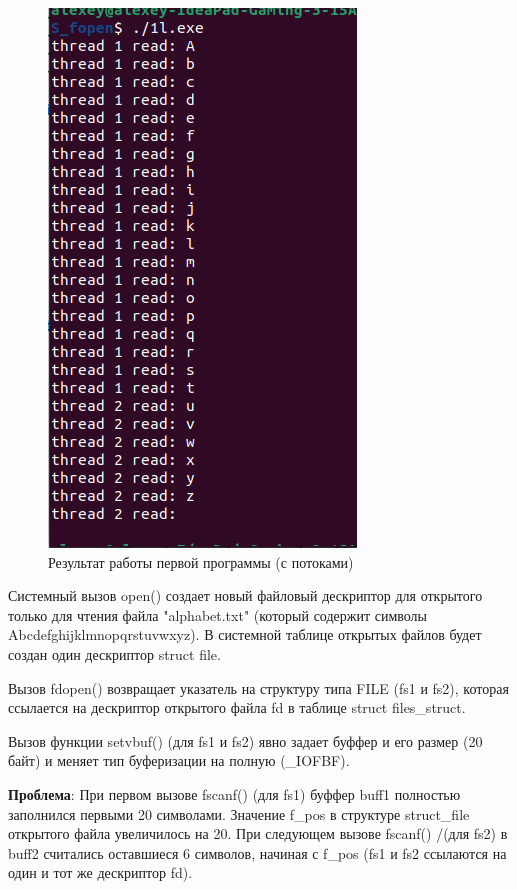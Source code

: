 \documentclass[12pt]{report}
\begin{document}
\begin{figure}[H]
	\centering
	\includegraphics[scale=1]{1lout.png}
	\caption{Результат работы первой программы (с потоками)}
	\label{fig:prog_01_thread}
\end{figure}

\clearpage

Системный вызов open() создает новый файловый дескриптор для открытого только для чтения файла "alphabet.txt" (который содержит символы Abcdefghijklmnopqrstuvwxyz). В системной таблице открытых файлов будет создан один дескриптор struct file.

Вызов fdopen() возвращает указатель на структуру типа FILE (fs1 и fs2), которая ссылается на дескриптор открытого файла fd в таблице struct files\_struct. 
	
Вызов функции setvbuf() (для fs1 и fs2)  явно задает буффер и его размер (20 байт) и меняет тип буферизации на полную (\_IOFBF).

\textbf{Проблема}: При первом вызове fscanf()  (для fs1) буффер buff1 полностью заполнился первыми 20 символами. Значение f\_pos в структуре struct\_file открытого файла увеличилось на 20. При следующем вызове fscanf() /(для fs2) в buff2 считались оставшиеся 6 символов, начиная с f\_pos (fs1 и fs2 ссылаются на один и тот же дескриптор fd).
\end{document}
